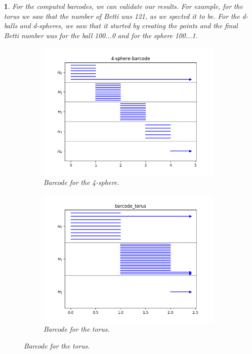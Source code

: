 \documentclass[10pt]{article} %
\theoremstyle{problemstyle}
\newtheorem{question}{\arabic{question}}
\begin{document}
\begin{question} %
For the computed barcodes, we can validate our results. For example, for the torus we saw that the number of Betti was 121, as we spected it to be. For the d-balls and d-spheres, we saw that it started by creating the points and the final Betti number was for the ball 100...0 and for the sphere 100...1.

\centering
\begin{figure}[H]
\begin{subfigure}[H]{0.4\linewidth}
\centering
\includegraphics[scale=0.4]{4-ball.png}
\caption{Barcode for the 4-sphere.}
\end{subfigure}
\hfill
\begin{subfigure}[H]{0.4\linewidth}
\centering
\includegraphics[scale=0.4]{torus.png}
\caption{Barcode for the torus.}
\end{subfigure}
\end{figure}


\end{question}
\end{document}
